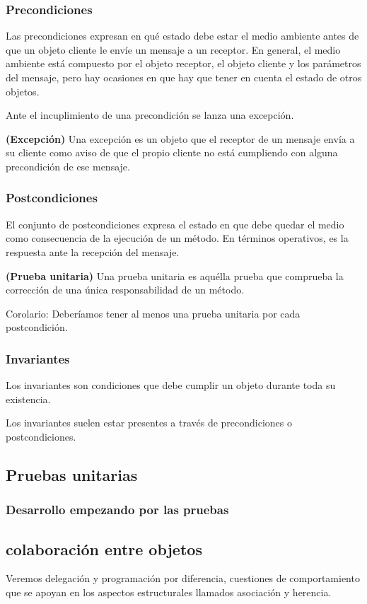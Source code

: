 \documentclass[../main.tex]{subfiles}
\begin{document}
        \subsubsection{Precondiciones}
            Las precondiciones expresan en qué estado debe estar el medio ambiente antes de que un objeto cliente le envíe un mensaje a un receptor. En general, el medio ambiente está compuesto por el objeto receptor, el objeto cliente y los parámetros del mensaje, pero hay ocasiones en que hay que tener en cuenta el estado de otros objetos.

            Ante el incuplimiento de una precondición se lanza una excepción.

            \begin{definition} \textbf{(Excepción)}
                Una excepción es un objeto que el receptor de un mensaje envía a su cliente como aviso de que el propio cliente no está cumpliendo con alguna precondición de ese mensaje.
             
            \end{definition}
        \subsubsection{Postcondiciones}
            El conjunto de postcondiciones expresa el estado en que debe quedar el medio como consecuencia de la ejecución de un método. En términos operativos, es la respuesta ante la recepción del mensaje.
            
            \begin{definition} \textbf{(Prueba unitaria)}
                Una prueba unitaria es aquélla prueba que comprueba la corrección de una única responsabilidad de un método.

                Corolario: Deberíamos tener al menos una prueba unitaria por cada postcondición.
            \end{definition}
        
        \subsubsection{Invariantes}
            Los invariantes son condiciones que debe cumplir un objeto durante toda su existencia.

            Los invariantes suelen estar presentes a través de precondiciones o postcondiciones.

    \subsection{Pruebas unitarias}
        \subsubsection{Desarrollo empezando por las pruebas}


    \subsection{colaboración entre objetos}
        Veremos delegación y programación por diferencia, cuestiones de comportamiento que se apoyan en los aspectos estructurales llamados asociación y herencia. 
\end{document}
